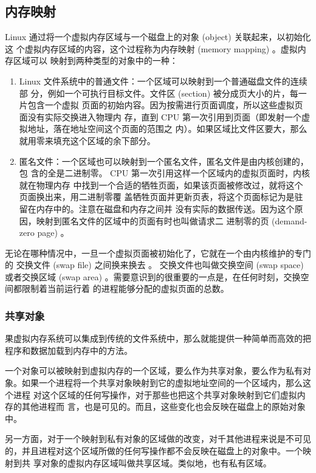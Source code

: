 \subsection{内存映射}

Linux 通过将一个虚拟内存区域与一个磁盘上的对象 (object) 关联起来，以初始化这
个虚拟内存区域的内容，这个过程称为内存映射 (memory mapping) 。虚拟内存区域可以
映射到两种类型的对象中的一种：
\begin{enumerate}
    \item Linux 文件系统中的普通文件：一个区域可以映射到一个普通磁盘文件的连续部
          分，例如一个可执行目标文件。文件区 (section) 被分成页大小的片，每一片包含一个虚拟
          页面的初始内容。因为按需进行页面调度，所以这些虚拟页面没有实际交换进入物理内
          存，直到 CPU 第一次引用到页面（即发射一个虚拟地址，落在地址空间这个页面的范围之
          内）。如果区域比文件区要大，那么就用零来填充这个区域的余下部分。
    \item 匿名文件：一个区域也可以映射到一个匿名文件，匿名文件是由内核创建的，包
          含的全是二进制零。 CPU 第一次引用这样一个区域内的虚拟页面时，内核就在物理内存
          中找到一个合适的牺牲页面，如果该页面被修改过，就将这个页面换出来，用二进制零覆
          盖牺牲页面并更新页表，将这个页面标记为是驻留在内存中的。注意在磁盘和内存之间并
          没有实际的数据传送。因为这个原因，映射到匿名文件的区域中的页面有时也叫做请求二
          进制零的页 (demand-zero page) 。
\end{enumerate}

无论在哪种情况中，一旦一个虚拟页面被初始化了，它就在一个由内核维护的专门的
交换文件 (swap file) 之间换来换去 。 交换文件也叫做交换空间 (swap space) 或者交换区域
(swap area) 。需要意识到的很重要的一点是，在任何时刻，交换空间都限制着当前运行着
的进程能够分配的虚拟页面的总数。

\subsubsection{共享对象}

果虚拟内存系统可以集成到传统的文件系统中，那么就能提供一种简单而高效的把程序和数据加载到内存中的方法。

一个对象可以被映射到虚拟内存的一个区域，要么作为共享对象，要么作为私有对
象。如果一个进程将一个共享对象映射到它的虚拟地址空间的一个区域内，那么这个进程
对这个区域的任何写操作，对于那些也把这个共享对象映射到它们虚拟内存的其他进程而
言，也是可见的。而且，这些变化也会反映在磁盘上的原始对象中。

另一方面，对于一个映射到私有对象的区域做的改变，对千其他进程来说是不可见
的，并且进程对这个区域所做的任何写操作都不会反映在磁盘上的对象中。一个映射到共
享对象的虚拟内存区域叫做共享区域。类似地，也有私有区域。

